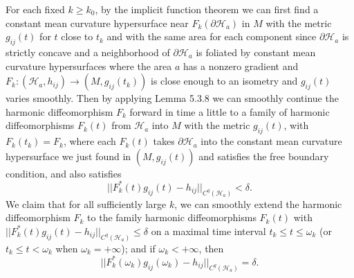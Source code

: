 For each fixed $k\ge k_0$, by the implicit function theorem we can
first find a constant mean curvature hypersurface near
$F_k(\partial \mathcal{H}_a)$ in $M$ with the metric $g_{ij}(t)$
for $t$ close to $t_k$ and with the same area for each component
since $\partial \mathcal{H}_a$ is strictly concave and a
neighborhood of $\partial\mathcal{H}_a$ is foliated by constant
mean curvature hypersurfaces where the area $a$ has a nonzero
gradient and
$F_k:(\mathcal{H}_a,h_{ij})\rightarrow(M,g_{ij}(t_k))$ is close
enough to an isometry and $g_{ij}(t)$ varies smoothly. Then by
applying Lemma 5.3.8 we can smoothly continue the harmonic
diffeomorphism $F_k$ forward in time a little to a family of
harmonic diffeomorphisms $F_k(t)$ from $\mathcal{H}_a$ into $M$
with the metric $g_{ij}(t)$, with $F_k(t_k)=F_k$, where each
$F_k(t)$ takes $\partial \mathcal{H}_a$ into the constant mean
curvature hypersurface we just found in $(M,g_{ij}(t))$ and
satisfies the free boundary condition, and also satisfies
$$
||F^*_k(t)g_{ij}(t)-h_{ij}||_{C^q(\mathcal{H}_a)}<\delta.
$$
We claim that for all sufficiently large $k$, we can smoothly
extend the harmonic diffeomorphism $F_k$ to the family harmonic
diffeomorphisms $F_k(t)$ with
$||F^*_k(t)g_{ij}(t)-h_{ij}||_{C^q(\mathcal{H}_a)}\le\delta$ on a
maximal time interval $t_k\le t\leq\omega_k$ (or $t_k\leq
t<\omega_k$ when $\omega_k=+\infty$); and if $\omega_k<+\infty$,
then \begin{equation}
||F^*_k(\omega_k)g_{ij}(\omega_k)-h_{ij}||_{C^q(\mathcal{H}_a)}
=\delta.  %
\end{equation}

